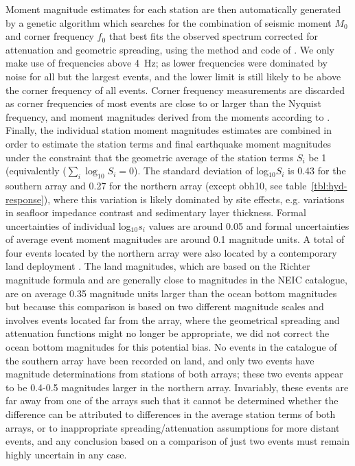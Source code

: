 \documentclass[reviewcopy]{elsart}
\begin{document}
Moment magnitude estimates for each station are
 then automatically generated by a genetic
 algorithm which searches for the combination of seismic moment $M_0$
 and corner frequency $f_0$ that best
 fits the observed spectrum corrected for attenuation and geometric
 spreading, using the method and code of
 \citet{ottemoeller03}.
We only make use of frequencies above 4~Hz; as lower frequencies were dominated by noise for all
but the largest events, and the
lower limit is still likely to be above the corner frequency of all events.  
Corner frequency measurements
are discarded as corner frequencies of most events are close to or
larger than the Nyquist frequency, and moment magnitudes derived from
the moments according to \citet{kanamori77}.   Finally, the individual station
moment magnitudes estimates are combined in order to estimate the
station terms and final earthquake moment magnitudes under the
constraint that the geometric average of the station terms $S_i$ be
1 (equivalently ($\sum_i \log_{10}S_i=0$).  
The standard deviation of
log$_{10}S_i$ is 0.43 for the southern array and 0.27 for the northern
array (except obh10, see table~\ref{tbl:hyd-response}), where this variation is likely 
dominated by site effects, e.g. variations in seafloor impedance
contrast and sedimentary layer thickness. Formal uncertainties of individual log$_{10}s_i$ values are
around 0.05 and formal uncertainties of average event moment
magnitudes are around 0.1 magnitude units. 
A total of four events located by the northern array were also located
by a contemporary land deployment \citep{lange07}.
 The land magnitudes, which are based on the Richter magnitude
formula and are generally close to magnitudes in the NEIC catalogue, are on average 0.35 magnitude units larger
than the ocean bottom magnitudes but because this comparison is based
on two different magnitude scales and involves  events located far
from the array, where the geometrical 
spreading and attenuation functions might no longer be appropriate, we
did not correct the ocean bottom magnitudes for this potential bias.
No events in the catalogue of the southern array  have been recorded
on land, and only two events have magnitude determinations from
stations of both arrays; these two events appear to be 0.4-0.5
magnitudes larger in the northern array.  Invariably, these events are
far away from one of the arrays such that it cannot be determined whether the
difference can be attributed to differences in the average station
terms of both arrays, or to inappropriate spreading/attenuation
assumptions for more distant events, and any conclusion based on a
comparison of just two events must remain highly uncertain in any case. 
\end{document}
